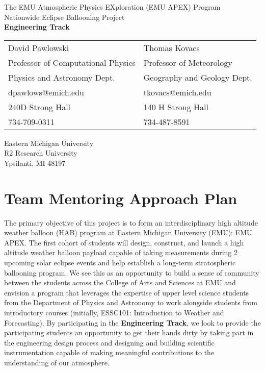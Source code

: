 \documentclass[12pt]{article}
\begin{document}
\Large
\begin{center}
The EMU Atmospheric Physics EXploration (EMU APEX) Program\\
\large
\vspace{2cm}
Nationwide Eclipse Ballooning Project\\
{\bf Engineering Track}
\vspace{1in}

\normalsize
\begin{table}[h]
\centering

  \begin{tabular}{ll}
  David Pawlowski&Thomas Kovacs\\
  Professor of Computational Physics&Professor of Meteorology\\
    Physics and Astronomy Dept.&Geography and Geology Dept.\\
  dpawlows@emich.edu&tkovacs@emich.edu\\
  240D Strong Hall&140 H Strong Hall\\
  734-709-0311&734-487-8591

  \end{tabular}
\end{table}


Eastern Michigan University\\
 R2 Research University\\
Ypsilanti, MI 48197
\end{center}

\small\normalsize
\newpage
\tableofcontents

\newpage
\section{Team Mentoring Approach Plan}
\label{intro}
The primary objective of this project is to form an interdisciplinary
high altitude weather balloon (HAB) program at Eastern Michigan University (EMU): EMU APEX.
The first cohort of students will design, construct, and launch a
high altitude weather balloon payload
capable of taking measurements during 2 upcoming solar eclipse events and help
establish a long-term stratospheric ballooning program. We see this as an opportunity to build a sense of
community between the students across the College of Arts and Sciences at EMU and envision a program
that leverages the expertise of upper level science students from the Department of Physics and Astronomy
to work alongside students from introductory courses (initially, ESSC101:
Introduction to Weather and Forecasting). By participating in the {\bf Engineering Track}, we look to
provide the participating students an opportunity to get their hands dirty by taking part in the
engineering design process and designing and building scientific instrumentation capable of making
meaningful contributions to the understanding of our atmosphere.
\end{document}

